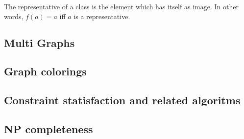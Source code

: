 \documentclass{article}
\begin{document}
The representative of a class is the element which has itself as image. In other words, $f(a) = a$ iff $a$ is a representative.
\cite{sourceArmen} \cite{sourceAATA}

\subsection{Multi Graphs}

\subsection{Graph colorings}

\subsection{Constraint statisfaction and related algoritms}

\subsection{NP completeness}

\printbibliography
\end{document}
